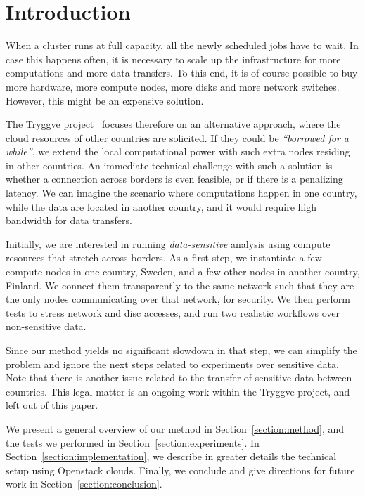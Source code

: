 \section{Introduction}
\label{section:intro}

When a cluster runs at full capacity, all the newly scheduled jobs
have to wait. In case this happens often, it is necessary to scale up
the infrastructure for more computations and more data transfers. To
this end, it is of course possible to buy more hardware, \ie more
compute nodes, more disks and more network switches. However, this
might be an expensive solution.

The \href{https://wiki.neic.no/wiki/Tryggve}{Tryggve
  project}~\cite{tryggve} focuses therefore on an alternative
approach, where the cloud resources of other countries are solicited.
%
If they could be \emph{``borrowed for a while''}, we extend the local
computational power with such extra nodes residing in other countries.
%
An immediate technical challenge with such a solution is whether a
connection across borders is even feasible, or if there is a
penalizing latency. We can imagine the scenario where computations
happen in one country, while the data are located in another country,
and it would require high bandwidth for data transfers.

Initially, we are interested in running \emph{data-sensitive}
analysis using compute resources that stretch across borders.
%
As a first step, we instantiate a few compute nodes in one country,
Sweden, and a few other nodes in another country, Finland. We
connect them transparently to the same network such that they are
the only nodes communicating over that network, for security. We then
perform tests to stress network and disc accesses, and run two
realistic workflows over non-sensitive data.

Since our method yields no significant slowdown in that step, we
can simplify the problem and ignore the next steps related to
experiments over sensitive data.
%
Note that there is another issue related to the transfer of sensitive
data between countries. This legal matter is an ongoing work within
the Tryggve project, and left out of this paper.

We present a general overview of our method in
Section~\ref{section:method}, and the tests we performed in
Section~\ref{section:experiments}.
%
In Section~\ref{section:implementation}, we describe in greater
details the technical setup using Openstack clouds.
%
Finally, we conclude and give directions for future work in
Section~\ref{section:conclusion}.
